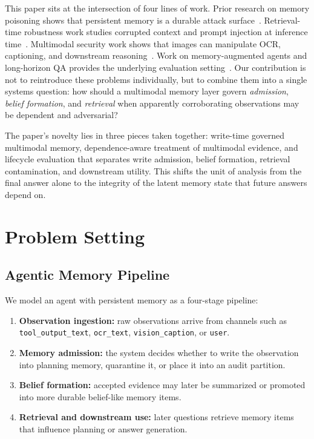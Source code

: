 \documentclass{article}
\begin{document}
This paper sits at the intersection of four lines of work. Prior research on memory poisoning shows that persistent memory is a durable attack surface~\cite{ref1,ref2,ref3}. Retrieval-time robustness work studies corrupted context and prompt injection at inference time~\cite{ref4,ref5,ref6,ref7}. Multimodal security work shows that images can manipulate OCR, captioning, and downstream reasoning~\cite{ref8}. Work on memory-augmented agents and long-horizon QA provides the underlying evaluation setting~\cite{ref9,ref10,ref11}. Our contribution is not to reintroduce these problems individually, but to combine them into a single systems question: how should a multimodal memory layer govern \emph{admission}, \emph{belief formation}, and \emph{retrieval} when apparently corroborating observations may be dependent and adversarial?

The paper's novelty lies in three pieces taken together: write-time governed multimodal memory, dependence-aware treatment of multimodal evidence, and lifecycle evaluation that separates write admission, belief formation, retrieval contamination, and downstream utility. This shifts the unit of analysis from the final answer alone to the integrity of the latent memory state that future answers depend on.



\section{Problem Setting}

\subsection{Agentic Memory Pipeline}

We model an agent with persistent memory as a four-stage pipeline:

\begin{enumerate}
\item \textbf{Observation ingestion:} raw observations arrive from channels such as \texttt{tool\_output\_text}, \texttt{ocr\_text}, \texttt{vision\_caption}, or \texttt{user}.
\item \textbf{Memory admission:} the system decides whether to write the observation into planning memory, quarantine it, or place it into an audit partition.
\item \textbf{Belief formation:} accepted evidence may later be summarized or promoted into more durable belief-like memory items.
\item \textbf{Retrieval and downstream use:} later questions retrieve memory items that influence planning or answer generation.
\end{enumerate}
\end{document}
